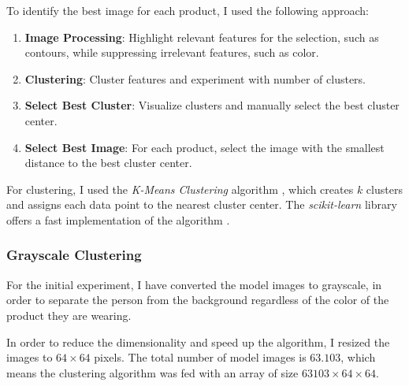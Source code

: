 \documentclass[12pt]{report}
\begin{document}
To identify the best image for each product, I used the following approach:
\begin{enumerate}
	\item \textbf{Image Processing}: Highlight relevant features for the selection, such as contours, while suppressing irrelevant features, such as color.
	\item \textbf{Clustering}: Cluster features and experiment with number of clusters.
	\item \textbf{Select Best Cluster}: Visualize clusters and manually select the best cluster center.
	\item \textbf{Select Best Image}: For each product, select the image with the smallest distance to the best cluster center.
\end{enumerate}


For clustering, I used the \textit{K-Means Clustering} algorithm \cite{noauthor_k-means_2018}, which creates $k$ clusters and assigns each data point to the nearest cluster center. The \textit{scikit-learn} library offers a fast implementation of the algorithm \cite{noauthor_sklearn.cluster.kmeans_nodate}.

\subsubsection{Grayscale Clustering}
For the initial experiment, I have converted the model images to grayscale, in order to separate the person from the background regardless of the color of the product they are wearing. 

In order to reduce the dimensionality and speed up the algorithm, I resized the images to $64\times64$ pixels. The total number of model images is $63.103$, which means the clustering algorithm was fed with an array of size $63103\times64\times64$.


\end{document}
